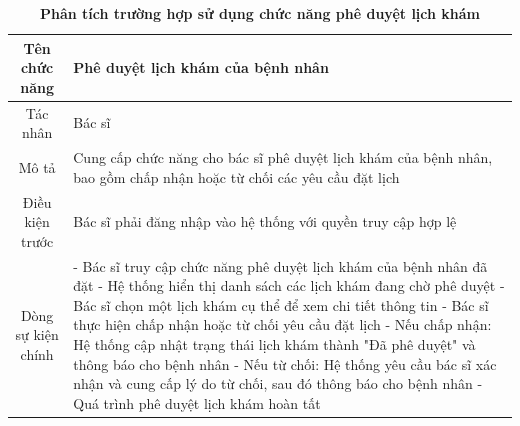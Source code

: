 \begin{table}[H]
	\caption{\bfseries \fontsize{12pt}{0pt}\selectfont Phân tích trường hợp sử dụng chức năng phê duyệt lịch khám}
	\centering
	\begin{tabularx}{0.9\textwidth}{|c|X|}
		\hline
		\textbf{Tên chức năng} & \textbf{Phê duyệt lịch khám của bệnh nhân}                                                                           \\
		\hline
		Tác nhân               & Bác sĩ                                                                                                               \\
		\hline
		Mô tả                  & Cung cấp chức năng cho bác sĩ phê duyệt lịch khám của bệnh nhân, bao gồm chấp nhận hoặc từ chối các yêu cầu đặt lịch \\
		\hline
		Điều kiện trước        & Bác sĩ phải đăng nhập vào hệ thống với quyền truy cập hợp lệ                                                         \\
		\hline
		Dòng sự kiện chính     &
		- Bác sĩ truy cập chức năng phê duyệt lịch khám của bệnh nhân đã đặt \newline
		- Hệ thống hiển thị danh sách các lịch khám đang chờ phê duyệt \newline
		- Bác sĩ chọn một lịch khám cụ thể để xem chi tiết thông tin \newline
		- Bác sĩ thực hiện chấp nhận hoặc từ chối yêu cầu đặt lịch \newline
		- Nếu chấp nhận: Hệ thống cập nhật trạng thái lịch khám thành "Đã phê duyệt" và thông báo cho bệnh nhân \newline
		- Nếu từ chối: Hệ thống yêu cầu bác sĩ xác nhận và cung cấp lý do từ chối, sau đó thông báo cho bệnh nhân \newline
		- Quá trình phê duyệt lịch khám hoàn tất                                                                                                      \\
		\hline
	\end{tabularx}
\end{table}


